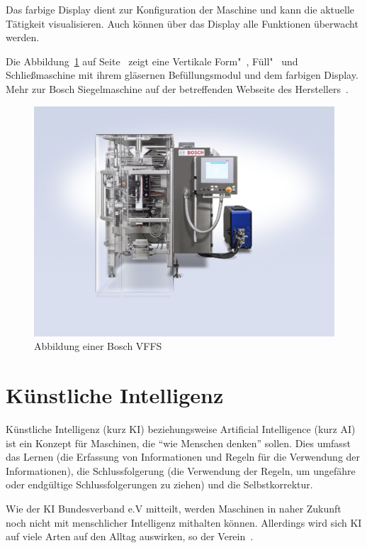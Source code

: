 Das farbige Display dient zur Konfiguration der Maschine und kann die aktuelle Tätigkeit visualisieren. Auch können über
das Display alle Funktionen überwacht werden.

Die Abbildung~\ref{fig:grundlagen_boschvffs} auf Seite~\pageref{fig:grundlagen_boschvffs} zeigt eine Vertikale Form"~,
Füll"~ und Schließmaschine mit ihrem gläsernen Befüllungsmodul und dem farbigen Display. Mehr zur Bosch Siegelmaschine
auf der betreffenden Webseite des Herstellers~\cite{online_siegelmaschinen_vffs}.

\begin{figure}[h]
    \centering
    \includegraphics[scale=0.2]{images/kapitel_2/bosch_vffs.jpg}
    \caption{Abbildung einer Bosch VFFS}
    \label{fig:grundlagen_boschvffs}
\end{figure}

\section{Künstliche Intelligenz}
Künstliche Intelligenz (kurz KI) beziehungsweise Artificial Intelligence (kurz AI) ist ein Konzept für Maschinen, die
\enquote{wie Menschen denken} sollen. Dies umfasst das Lernen (die Erfassung von Informationen und Regeln für die
Verwendung der Informationen), die Schlussfolgerung (die Verwendung der Regeln, um ungefähre oder endgültige
Schlussfolgerungen zu ziehen) und die Selbstkorrektur.

Wie der KI Bundesverband e.V mitteilt, werden Maschinen in naher Zukunft noch nicht mit menschlicher Intelligenz
mithalten können. Allerdings wird sich KI auf viele Arten auf den Alltag auswirken, so der
Verein~\cite{article_grundlagen_ki}.

